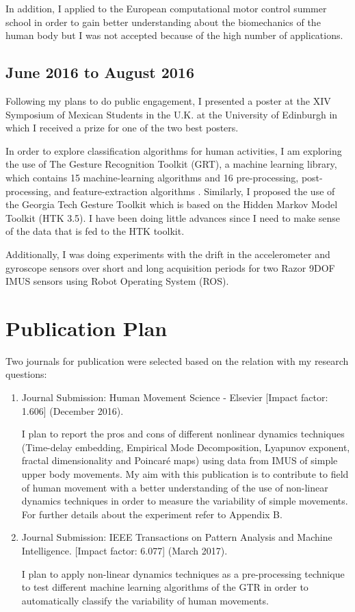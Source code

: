 \documentclass[9pt,journal,onecolumn,compsoc]{IEEEtran}
\begin{document}
In addition,
I applied to the European computational motor control summer school
in order to gain better understanding about the biomechanics of the human body
but I was not accepted because of the high number of applications.

\subsection{June 2016 to August 2016}

Following my plans to do public engagement, I presented a poster at the XIV Symposium of Mexican Students in the U.K.
at the University of Edinburgh in which I received a prize for one of the two best posters.

In order to explore classification algorithms for human activities,
I am exploring the use of The Gesture Recognition Toolkit (GRT), a machine learning library,
which contains 15 machine-learning algorithms and 16 pre-processing, post-processing, and feature-extraction algorithms
\cite{Gillian2014}. Similarly, I proposed the use of the Georgia Tech Gesture Toolkit \cite{Westeyn2003}
which is based on the Hidden Markov Model Toolkit (HTK 3.5). I have been doing little advances
since I need to make sense of the data that is fed to the HTK toolkit.

Additionally, I was doing experiments with the drift in the accelerometer and gyroscope sensors
over short and long acquisition periods for two Razor 9DOF IMUS sensors using Robot Operating System (ROS).

\section{Publication Plan}

Two journals for publication
were selected based on the relation with my research questions:


\begin{enumerate}
 \item Journal Submission: Human Movement Science - Elsevier [Impact factor: 1.606] (December 2016).

I plan to report the pros and cons of different nonlinear dynamics techniques
(Time-delay embedding, Empirical Mode Decomposition, Lyapunov exponent, fractal dimensionality and Poincar\'e maps)
using data from IMUS of simple upper body movements.
My aim with this publication is to contribute to field of human movement
with a better understanding of the use of non-linear dynamics techniques
in order to measure the variability of simple movements.
For further details about the experiment refer to Appendix B.


\item Journal Submission: IEEE Transactions on Pattern Analysis and Machine Intelligence.
[Impact factor: 6.077] (March 2017).

I plan to apply non-linear dynamics techniques as a pre-processing technique
to test different machine learning algorithms of the GTR in order
to automatically classify the variability of human movements.

\end{enumerate}
\end{document}
